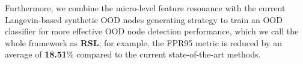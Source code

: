 

Furthermore, we combine the micro-level feature resonance with the current Langevin-based synthetic OOD nodes generating strategy to train an OOD classifier for more effective OOD node detection performance, which we call the whole framework as \textbf{RSL}; for example, the FPR95 metric is reduced by an average of \textbf{18.51}\% compared to the current state-of-the-art methods.





